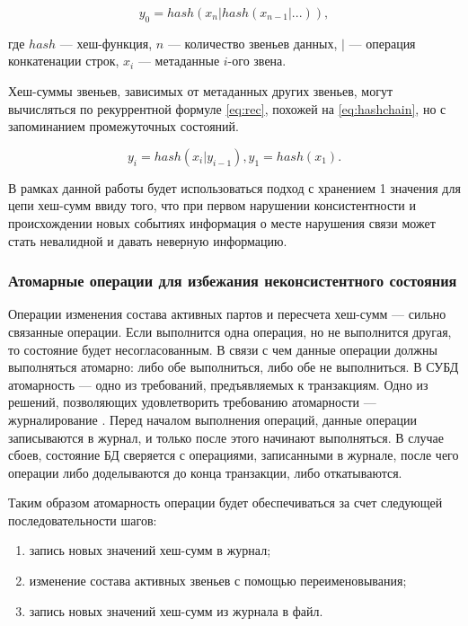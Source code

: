 \begin{equation}
\label{eq:hashchain}
y_0 = hash(x_n | hash(x_{n-1} | ...)),
\end{equation}

где $hash$ --- хеш-функция, $n$ --- количество звеньев данных, $|$ --- операция конкатенации строк, $x_i$ --- метаданные $i$-ого звена.

Хеш-суммы звеньев, зависимых от метаданных других звеньев, могут вычисляться по рекуррентной формуле \ref{eq:rec}, похожей на \ref{eq:hashchain}, но с запоминанием промежуточных состояний.

\begin{equation}
\label{eq:rec}
y_i = hash(x_i|y_{i-1}), y_1 = hash(x_1).
\end{equation}

В рамках данной работы будет использоваться подход с хранением 1 значения для цепи хеш-сумм ввиду того, что при первом нарушении консистентности и происхождении новых событиях информация о месте нарушения связи может стать невалидной и давать неверную информацию.

\subsubsection{Атомарные операции для избежания неконсистентного состояния}

Операции изменения состава активных партов и пересчета хеш-сумм --- сильно связанные операции. Если выполнится одна операция, но не выполнится другая, то состояние будет несогласованным. В связи с чем данные операции должны выполняться атомарно: либо обе выполниться, либо обе не выполниться. В СУБД атомарность \cite{atomicity} --- одно из требований, предъявляемых к транзакциям. Одно из решений, позволяющих удовлетворить требованию атомарности --- журналирование \cite{journaldbms}. Перед началом выполнения операций, данные операции записываются в журнал, и только после этого начинают выполняться. В случае сбоев, состояние БД сверяется с операциями, записанными в журнале, после чего операции либо доделываются до конца транзакции, либо откатываются.

Таким образом атомарность операции будет обеспечиваться за счет следующей последовательности шагов:
\begin{enumerate}
	\item запись новых значений хеш-сумм в журнал;
	\item изменение состава активных звеньев с помощью переименовывания;
	\item запись новых значений хеш-сумм из журнала в файл.
\end{enumerate}

